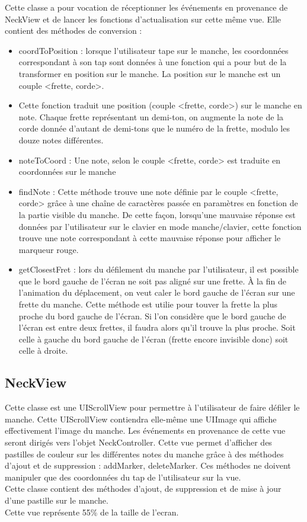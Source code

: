 \documentclass{scrreprt}
\begin{document}
Cette classe a pour vocation de réceptionner les événements en provenance de NeckView et de lancer les fonctions d’actualisation sur cette même vue. Elle contient des méthodes de conversion :
\begin{itemize}
\item coordToPosition : lorsque l'utilisateur tape sur le manche, les coordonnées correspondant à son tap sont données à une fonction qui a pour but de la transformer en position sur le manche. La position sur le manche est un couple <frette, corde>.
\item Cette fonction traduit une position (couple <frette, corde>) sur le manche en note. Chaque frette représentant un demi-ton, on augmente la note de la corde donnée d’autant de demi-tons que le numéro de la frette, modulo les douze notes différentes. 
\item noteToCoord : Une note, selon le couple <frette, corde> est traduite en coordonnées sur le manche
\item findNote : Cette méthode trouve une note définie par le couple <frette, corde> grâce à une chaîne de caractères passée en paramètres en fonction de la partie visible du manche. 
De cette façon, lorsqu'une mauvaise réponse est données par l'utilisateur sur le clavier en mode manche/clavier, cette fonction trouve une note correspondant à cette mauvaise réponse pour afficher le marqueur rouge.  
\item getClosestFret : lors du défilement du manche par l'utilisateur, il est possible que le bord gauche de l'écran ne soit pas aligné sur une frette. À la fin de l'animation du déplacement, on veut caler le bord gauche de l'écran sur une frette du manche. Cette méthode est utilie pour touver la frette la plus proche du bord gauche de l'écran. Si l'on considère que le bord gauche de l'écran est entre deux frettes, il faudra alors qu'il trouve la plus proche. Soit celle à gauche du bord gauche de l'écran (frette encore invisible donc) soit celle à droite.
\end{itemize}

\subsection{NeckView}

Cette classe est une UIScrollView pour permettre à l’utilisateur de faire défiler le manche. 
Cette UIScrollView contiendra elle-même une UIImage qui affiche effectivement l’image du manche.
Les événements en provenance de cette vue seront dirigés vers l’objet NeckController.
Cette vue permet d’afficher des pastilles de couleur sur les différentes notes du manche grâce à des méthodes d'ajout et de suppression : addMarker, deleteMarker. Ces méthodes ne doivent manipuler que des coordonnées du tap de l'utilisateur sur la vue.\\
Cette classe contient des méthodes d'ajout, de suppression et de mise à jour d'une pastille sur le manche. \\
Cette vue représente 55\% de la taille de l'ecran.
\end{document}
